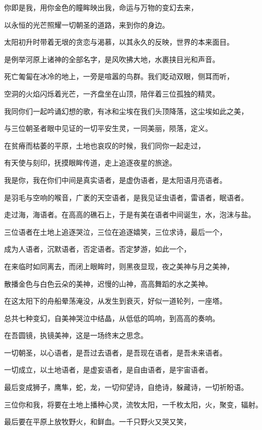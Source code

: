 \documentclass[UTF8]{article}
\begin{document}
\par 你即是我，用你金色的瞳眸映出我，命运与万物的变幻去来，
\par 以永恒的光芒照耀一切朝圣的道路，来到你的身边。
\\[0.6cm]
\par 太阳初升时带着无垠的贪恋与渴慕，以其永久的反映，世界的本来面目。
\par 是例举河原上诸神的全部名字，是风吹拂大地，水裹挟目光和声音。
\par 死亡匍匐在冰冷的地上，一旁是喧嚣的鸟群。我们眨动双眼，侧耳而听，
\par 空洞的火焰闪烁着光芒，一齐盘坐在山顶，陪伴着三位孤独的精灵。
\par 我同你们一起吟诵幻想的歌，有冰和尘埃在我们头顶降落，这尘埃如此之美，
\par 与三位朝圣者眼中见证的一切平安生灵，一同美丽，陨落，定义。
\par 在贫瘠而枯萎的平原，土地也哀叹的时候，我们同你一起走过，
\par 有天使与刻印，抚摸眼眸传道，走上追逐夜星的旅途。
\par 我是你，我在你们中间是真实语者，是虚伪语者，是太阳语月亮语者。
\par 是羽毛与空响的喉音，广袤的天空语者，是我见证虫语者，雷语者，眠语者。
\par 走过海，海语者。在高高的礁石上，于是有美在语者中间诞生，水，泡沫与盐。
\par 三位语者在土地上追逐哭泣，三位在追逐嬉笑，三位求诗，最后一个，
\par 成为人语者，沉默语者，否定语者。否定梦游，如此一个，
\par 在来临时如同离去，而闭上眼眸时，则黑夜显现，夜之美神与月之美神，
\par 散播金色与白色云朵的美神，迟慢的山神，高高舞蹈的水之美神。
\par 在这太阳下的舟船晕荡淹没，从发生到衰灭，好似一道轮列，一座塔。
\par 总共七种变幻，自美神哭泣中结晶，从低低的鸣响，到高高的奏响。
\par 在吾圆镜，执镜美神，这是一场终末之思念。
\par 一切朝圣，以心语者，是吾过去语者，是吾现在语者，是吾未来语者。
\par 一切成立，以土地语者，是虚妄语者，是自由语者，是宇宙语者。
\par 最后变成狮子，鹰隼，蛇，龙，一切仰望诗，自绝诗，躲藏诗，一切祈盼语。
\par 三位你和我，将要在土地上播种心灵，流牧太阳，一千枚太阳，火，聚变，辐射。
\par 最后要在平原上放牧野火，和鲜血。一千只野火又哭又笑，
\end{document}
